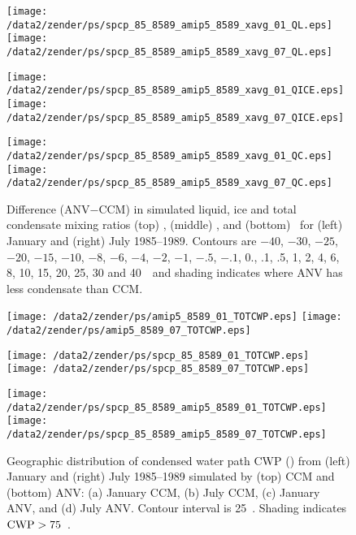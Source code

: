 \documentclass[twocolumn,final]{article}
\begin{document}
\begin{figure*}
\begin{center}
\texttt{[image: /data2/zender/ps/spcp\_85\_8589\_amip5\_8589\_xavg\_01\_QL.eps]}%
\texttt{[image: /data2/zender/ps/spcp\_85\_8589\_amip5\_8589\_xavg\_07\_QL.eps]}%

\texttt{[image: /data2/zender/ps/spcp\_85\_8589\_amip5\_8589\_xavg\_01\_QICE.eps]}%
\texttt{[image: /data2/zender/ps/spcp\_85\_8589\_amip5\_8589\_xavg\_07\_QICE.eps]}%

\texttt{[image: /data2/zender/ps/spcp\_85\_8589\_amip5\_8589\_xavg\_01\_QC.eps]}%
\texttt{[image: /data2/zender/ps/spcp\_85\_8589\_amip5\_8589\_xavg\_07\_QC.eps]}%
\end{center}
\caption[Difference (ANV$-$CCM) in simulated liquid, ice and total
condensate mixing ratios \ql, \qi, and \qc\ for January and July
1985--1989]{ 
Difference (ANV$-$CCM) in simulated liquid, ice and total
condensate mixing ratios (top) \ql, (middle) \qi, and (bottom) \qc\
for (left) January and (right) July 1985--1989.
Contours are $-40$, $-30$, $-25$, $-20$, $-15$, $-10$, $-8$,
$-6$, $-4$, $-2$, $-1$, $-.5$, $-.1$, 0., .1, .5, 1, 2, 4, 6, 8, 10,
15, 20, 25, 30 and 40~\mgxkg\ and shading indicates where ANV has less
condensate than CCM.  
\label{fig:xavg_8589_QLQIQC}}   
\end{figure*}
\clearpage

\begin{figure*}
\begin{center}
\texttt{[image: /data2/zender/ps/amip5\_8589\_01\_TOTCWP.eps]}%
\texttt{[image: /data2/zender/ps/amip5\_8589\_07\_TOTCWP.eps]}%

\texttt{[image: /data2/zender/ps/spcp\_85\_8589\_01\_TOTCWP.eps]}%
\texttt{[image: /data2/zender/ps/spcp\_85\_8589\_07\_TOTCWP.eps]}%

\texttt{[image: /data2/zender/ps/spcp\_85\_8589\_amip5\_8589\_01\_TOTCWP.eps]}%
\texttt{[image: /data2/zender/ps/spcp\_85\_8589\_amip5\_8589\_07\_TOTCWP.eps]}%
\end{center}
\caption[Geographic distribution of condensed water path CWP from 
January and July 1985--1989 simulated by CCM and ANV]{
Geographic distribution of condensed water path CWP (\gxmS) from 
(left) January and (right) July 1985--1989 simulated by (top) CCM and
(bottom) ANV: (a) January CCM, (b) July CCM, (c) January ANV, and (d)
July ANV. 
Contour interval is 25~\gxmS. 
Shading indicates $\mbox{\textrm{CWP}} > 75$~\gxmS.
\label{fig:8589_TOTCWP}}   
\end{figure*}
\clearpage
\end{document}
